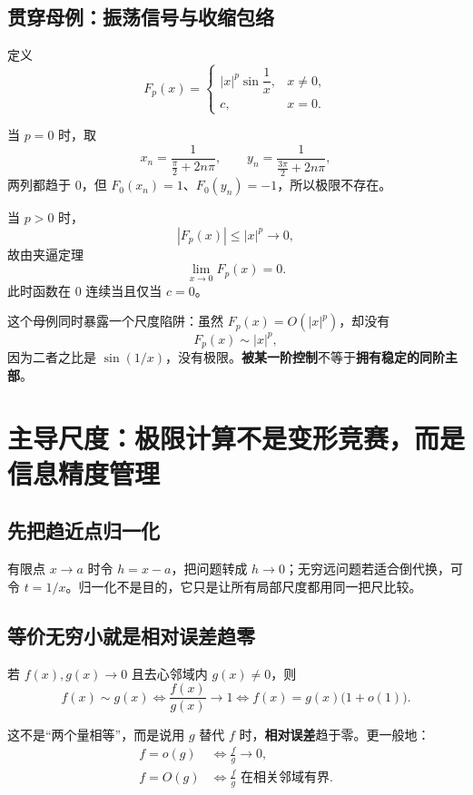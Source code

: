 \documentclass[11pt,a4paper]{ctexart}
\newcommand{\kw}[1]{\textbf{\color{deep}#1}}
\begin{document}
\subsection{贯穿母例：振荡信号与收缩包络}

定义
\[
F_p(x)=
\begin{cases}
|x|^p\sin\dfrac1x,&x\ne0,\\
c,&x=0.
\end{cases}
\]

当 $p=0$ 时，取
\[
x_n=\frac{1}{\frac\pi2+2n\pi},\qquad
y_n=\frac{1}{\frac{3\pi}{2}+2n\pi},
\]
两列都趋于 $0$，但 $F_0(x_n)=1$、$F_0(y_n)=-1$，所以极限不存在。

当 $p>0$ 时，
\[
|F_p(x)|\le |x|^p\to0,
\]
故由夹逼定理
\[
\lim_{x\to0}F_p(x)=0.
\]
此时函数在 $0$ 连续当且仅当 $c=0$。

这个母例同时暴露一个尺度陷阱：虽然 $F_p(x)=O(|x|^p)$，却没有
\[
F_p(x)\sim |x|^p,
\]
因为二者之比是 $\sin(1/x)$，没有极限。\kw{被某一阶控制}不等于\kw{拥有稳定的同阶主部}。

\section{主导尺度：极限计算不是变形竞赛，而是信息精度管理}

\subsection{先把趋近点归一化}

有限点 $x\to a$ 时令 $h=x-a$，把问题转成 $h\to0$；无穷远问题若适合倒代换，可令 $t=1/x$。归一化不是目的，它只是让所有局部尺度都用同一把尺比较。

\subsection{等价无穷小就是相对误差趋零}

若 $f(x),g(x)\to0$ 且去心邻域内 $g(x)\ne0$，则
\[
f(x)\sim g(x)
\iff \frac{f(x)}{g(x)}\to1
\iff f(x)=g(x)\bigl(1+o(1)\bigr).
\]

这不是“两个量相等”，而是说用 $g$ 替代 $f$ 时，\kw{相对误差}趋于零。更一般地：
\begin{align*}
f=o(g)&\iff \frac{f}{g}\to0,\\
f=O(g)&\iff \frac{f}{g}\text{ 在相关邻域有界}.
\end{align*}
\end{document}
